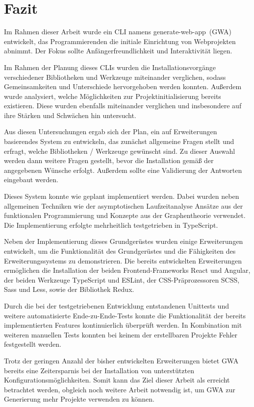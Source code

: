 \section{Fazit}
\label{fazit}

Im Rahmen dieser Arbeit wurde ein \gls{CLI} namens \glqq generate-web-app\grqq\ (\gls{GWA}) entwickelt, das Programmierenden die initiale Einrichtung von Webprojekten abnimmt. Der Fokus sollte Anfängerfreundlichkeit und Interaktivität liegen.

Im Rahmen der Planung dieses \gls{CLI}s wurden die Installationsvorgänge verschiedener Bibliotheken und Werkzeuge miteinander verglichen, sodass Gemeinsamkeiten und Unterschiede hervorgehoben werden konnten. Außerdem wurde analysiert, welche Möglichkeiten zur Projektinitialisierung bereits existieren. Diese wurden ebenfalls miteinander verglichen und insbesondere auf ihre Stärken und Schwächen hin untersucht.

Aus diesen Untersuchungen ergab sich der Plan, ein auf Erweiterungen basierendes System zu entwickeln, das zunächst allgemeine Fragen stellt und erfragt, welche Bibliotheken / Werkzeuge gewünscht sind. Zu dieser Auswahl werden dann weitere Fragen gestellt, bevor die Installation gemäß der angegebenen Wünsche erfolgt. Außerdem sollte eine Validierung der Antworten eingebaut werden.

Dieses System konnte wie geplant implementiert werden. Dabei wurden neben allgemeinen Techniken wie der asymptotischen Laufzeitanalyse Ansätze aus der funktionalen Programmierung und Konzepte aus der Graphentheorie verwendet. Die Implementierung erfolgte mehrheitlich testgetrieben in TypeScript.

Neben der Implementierung dieses Grundgerüstes wurden einige Erweiterungen entwickelt, um die Funktionalität des Grundgerüstes und die Fähigkeiten des Erweiterungssystems zu demonstrieren. Die bereits entwickelten Erweiterungen ermöglichen die Installation der beiden Frontend-Frameworks React und Angular, der beiden Werkzeuge TypeScript und ESLint, der CSS-Präprozessoren SCSS, Sass und Less, sowie der Bibliothek Redux.

Durch die bei der testgetriebenen Entwicklung entstandenen Unittests und weitere automatisierte Ende-zu-Ende-Tests konnte die Funktionalität der bereits implementierten Features kontinuierlich überprüft werden. In Kombination mit weiteren manuellen Tests konnten bei keinem der erstellbaren Projekte Fehler festgestellt werden.

Trotz der geringen Anzahl der bisher entwickelten Erweiterungen bietet \gls{GWA} bereits eine Zeitersparnis bei der Installation von unterstützten Konfigurationsmöglichkeiten. Somit kann das Ziel dieser Arbeit als erreicht betrachtet werden, obgleich noch weitere Arbeit notwendig ist, um \gls{GWA} zur Generierung mehr Projekte verwenden zu können.
